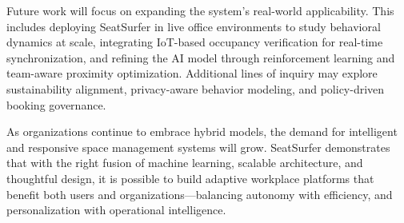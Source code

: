 \documentclass[onecolumn, 12pt]{IEEEtran}
\begin{document}
Future work will focus on expanding the system's real-world applicability. This includes deploying SeatSurfer in live office environments to study behavioral dynamics at scale, integrating IoT-based occupancy verification for real-time synchronization, and refining the AI model through reinforcement learning and team-aware proximity optimization. Additional lines of inquiry may explore sustainability alignment, privacy-aware behavior modeling, and policy-driven booking governance.

As organizations continue to embrace hybrid models, the demand for intelligent and responsive space management systems will grow. SeatSurfer demonstrates that with the right fusion of machine learning, scalable architecture, and thoughtful design, it is possible to build adaptive workplace platforms that benefit both users and organizations—balancing autonomy with efficiency, and personalization with operational intelligence.



\end{document}
